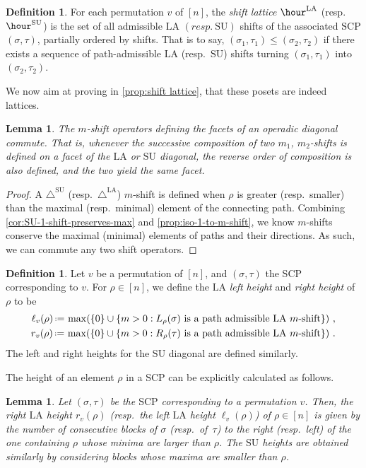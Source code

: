 \documentclass{amsart}
\newcommand{\darkblue}{\color{darkblue}} %
\newtheorem{lemma}[theorem]{Lemma}
\theoremstyle{definition}
\newtheorem{definition}[theorem]{Definition}
\newcommand{\eqdef}{\mbox{\,\raisebox{0.2ex}{\scriptsize\ensuremath{\mathrm:}}\ensuremath{=}\,}} %
\newcommand{\resp}{resp.~} %
\newcommand{\defn}[1]{\textsl{\darkblue #1}} %
\newcommand{\SU}{\mathrm{SU}}
\newcommand{\LA}{\mathrm{LA}}
\newcommand{\SUD}{\triangle^{\mathrm{SU}}}
\newcommand{\LAD}{\triangle^{\mathrm{LA}}}
\newcommand{\SCP}{\mathrm{SCP}}
\begin{document}
\begin{definition}
\label{def:shift-lattice}
For each permutation $v$ of $[n]$, the \defn{shift lattice} $\hour^\LA$ (\resp $\hour^\SU$) is the set of all admissible $\LA$ $(\resp \SU)$ shifts of the associated $\SCP$ $(\sigma,\tau)$, partially ordered by shifts.
That is to say, $(\sigma_1,\tau_1)\leq (\sigma_2,\tau_2)$ if there exists a sequence of path-admissible $\LA$ (\resp $\SU$) shifts turning $(\sigma_1,\tau_1)$ into $(\sigma_2,\tau_2)$.
\end{definition}

We now aim at proving in \cref{prop:shift lattice}, that these posets are indeed lattices.

\begin{lemma}
\label{lem:m-shifts commute}
The $m$-shift operators defining the facets of an operadic diagonal commute. 
That is, whenever the successive composition of two $m_1$, $m_2$-shifts is defined on a facet of the $\LA$ or $\SU$ diagonal, the reverse order of composition is also defined, and the two yield the same facet. 
\end{lemma}
\begin{proof}
A $\SUD$ (\resp $\LAD$) $m$-shift is defined when $\rho$ is greater (\resp smaller) than the maximal (\resp minimal) element of the connecting path.
Combining \cref{cor:SU-1-shift-preserves-max} and \cref{prop:iso-1-to-m-shift}, we know $m$-shifts conserve the maximal (minimal) elements of paths and their directions.
As such, we can commute any two shift operators.
\end{proof}

\begin{definition}
	\label{def:heights}
Let $v$ be a permutation of $[n]$, and $(\sigma,\tau)$ the SCP corresponding to $v$.
For $\rho \in [n]$, we define the $\LA$ \defn{left height} and \defn{right height} of $\rho$ to be 
\begin{align*}
	\ell_v(\rho) \eqdef \max (\{0\}\cup \{m>0: L_{\rho}(\sigma) \text{ is a path admissible $\LA$ $m$-shift} \}) \ , \\
	r_v(\rho) \eqdef \max (\{0\}\cup \{m>0: R_{\rho}(\tau) \text{ is a path admissible $\LA$ $m$-shift} \}) \ .
\end{align*}
The left and right heights for the $\SU$ diagonal are defined similarly. 
\end{definition}

The height of an element $\rho$ in a $\SCP$ can be explicitly calculated as follows. 

\begin{lemma}
\label{prop:maximal m-shift formulae}
Let $(\sigma,\tau)$ be the $\SCP$ corresponding to a permutation $v$.
Then, the right $\LA$ height $r_v(\rho)$ (\resp the left $\LA$ height $\ell_v(\rho)$) of $\rho \in [n]$ is given by the number of consecutive blocks of $\sigma$ (\resp of~$\tau$) to the right (\resp left) of the one containing $\rho$ whose minima are larger than $\rho$.
The $\SU$ heights are obtained similarly by considering blocks whose maxima are smaller than $\rho$. 
\end{lemma}
\end{document}

